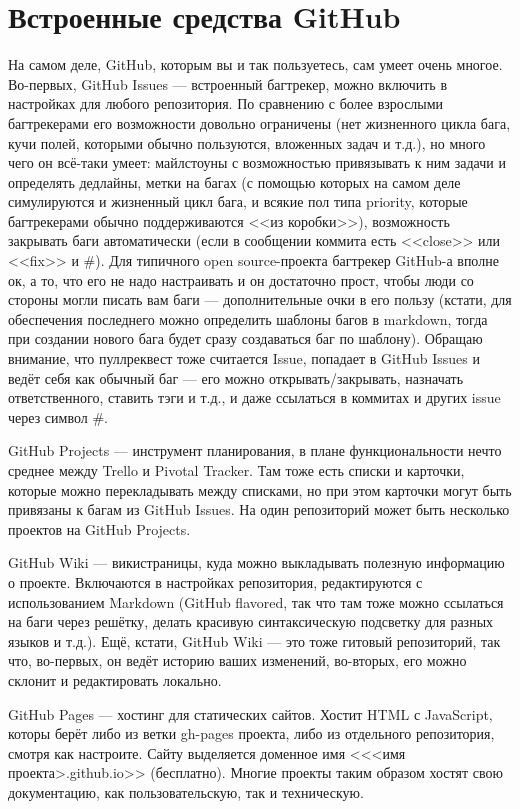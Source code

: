 \documentclass{../../text-style}
\begin{document}
\section{Встроенные средства GitHub}

На самом деле, GitHub, которым вы и так пользуетесь, сам умеет очень многое. Во-первых, GitHub Issues --- встроенный багтрекер, можно включить в настройках для любого репозитория. По сравнению с более взрослыми багтрекерами его возможности довольно ограничены (нет жизненного цикла бага, кучи полей, которыми обычно пользуются, вложенных задач и т.д.), но много чего он всё-таки умеет: майлстоуны с возможностью привязывать к ним задачи и определять дедлайны, метки на багах (с помощью которых на самом деле симулируются и жизненный цикл бага, и всякие пол типа priority, которые багтрекерами обычно поддерживаются <<из коробки>>),  возможность закрывать баги автоматически (если в сообщении коммита есть <<close>> или <<fix>> и \#<номер бага>). Для типичного open source-проекта багтрекер GitHub-а вполне ок, а то, что его не надо настраивать и он достаточно прост, чтобы люди со стороны могли писать вам баги --- дополнительные очки в его пользу (кстати, для обеспечения последнего можно определить шаблоны багов в markdown, тогда при создании нового бага будет сразу создаваться баг по шаблону). Обращаю внимание, что пуллреквест тоже считается Issue, попадает в GitHub Issues и ведёт себя как обычный баг --- его можно открывать/закрывать, назначать ответственного, ставить тэги и т.д., и даже ссылаться в коммитах и других issue через символ \#.

GitHub Projects --- инструмент планирования, в плане функциональности нечто среднее между Trello и Pivotal Tracker. Там тоже есть списки и карточки, которые можно перекладывать между списками, но при этом карточки могут быть привязаны к багам из GitHub Issues. На один репозиторий может быть несколько проектов на GitHub Projects.

GitHub Wiki --- викистраницы, куда можно выкладывать полезную информацию о проекте. Включаются в настройках репозитория, редактируются с использованием Markdown (GitHub flavored, так что там тоже можно ссылаться на баги через решётку, делать красивую синтаксическую подсветку для разных языков и т.д.). Ещё, кстати, GitHub Wiki --- это тоже гитовый репозиторий, так что, во-первых, он ведёт историю ваших изменений, во-вторых, его можно склонит и редактировать локально.

GitHub Pages --- хостинг для статических сайтов. Хостит HTML с JavaScript, которы берёт либо из ветки gh-pages проекта, либо из отдельного репозитория, смотря как настроите. Сайту выделяется доменное имя <<<имя проекта>.github.io>> (бесплатно). Многие проекты таким образом хостят свою документацию, как пользовательскую, так и техническую. 
\end{document}

